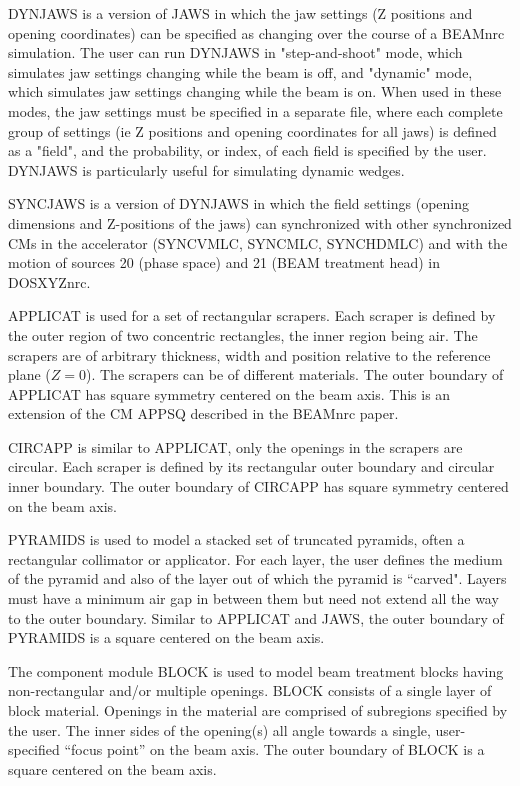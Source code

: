 \documentclass[12pt,twoside]{article}
\begin{document}
DYNJAWS is a version of JAWS in which the jaw settings
(Z positions and opening coordinates) can be specified as
changing over the course of a BEAMnrc simulation.  The user can
run DYNJAWS in "step-and-shoot" mode, which simulates jaw settings
changing while the beam is off, and "dynamic" mode, which simulates
jaw settings changing while the beam is on.  When used in these modes,
the jaw settings must be specified in a separate file, where each complete
group of settings (ie Z positions and opening coordinates for all jaws) is
defined as a "field", and the probability, or index, of each field is
specified by the user.  DYNJAWS is particularly useful for simulating
dynamic wedges.

SYNCJAWS is a version of DYNJAWS in which the field settings (opening dimensions
and Z-positions of the jaws) can synchronized with other synchronized CMs in the accelerator
(SYNCVMLC, SYNCMLC, SYNCHDMLC) and with the motion of sources 20 (phase space)
and 21 (BEAM treatment head) in DOSXYZnrc\cite{Wa05}.

APPLICAT is used for a  set of rectangular scrapers. Each scraper is defined by the
outer region of two concentric rectangles, the inner region being air.  The
scrapers are of arbitrary thickness, width and position relative to the
reference plane ($Z = 0$). The scrapers can be  of different  materials.
The outer boundary of APPLICAT has square symmetry centered on the beam
axis. This is an extension of the CM APPSQ described in the BEAMnrc
paper\cite{Ro95}.

CIRCAPP is similar to APPLICAT, only the openings in the scrapers
are circular.  Each scraper is defined by its rectangular outer boundary
and circular inner boundary.
The outer boundary of CIRCAPP has square symmetry centered on the beam
axis.

PYRAMIDS is used to model a stacked set of truncated pyramids, often a
rectangular collimator or applicator.  For each layer, the user defines the
medium of the pyramid and also of the layer out of which the pyramid
is ``carved".  Layers must have a minimum air gap in
between them but need not extend all the way to the outer
boundary.  Similar to APPLICAT and JAWS, the outer boundary of PYRAMIDS is
a square centered on the beam axis.

The component module BLOCK is used to model beam treatment blocks having
non-rectangular and/or multiple openings.  BLOCK consists of a single layer
of block material.  Openings in the material are comprised of subregions
specified by the user.  The inner sides of the opening(s) all angle
towards a single, user-specified ``focus point'' on the beam axis.  The outer
boundary of BLOCK is a square centered on the beam axis.
\end{document}
